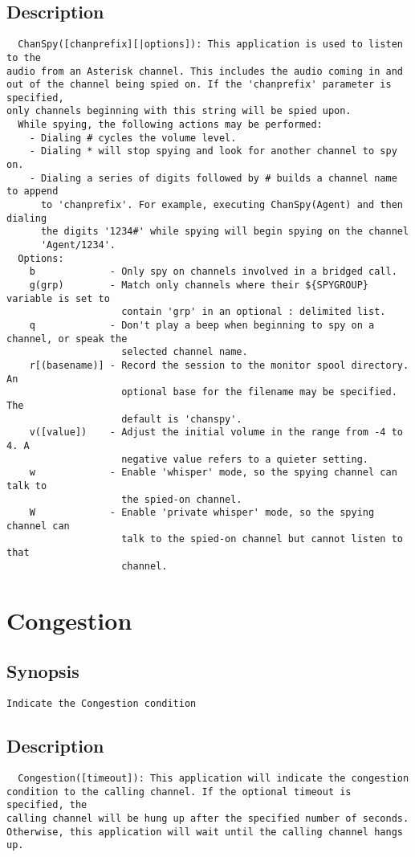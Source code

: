 \subsection{Description}
\begin{verbatim}
  ChanSpy([chanprefix][|options]): This application is used to listen to the
audio from an Asterisk channel. This includes the audio coming in and
out of the channel being spied on. If the 'chanprefix' parameter is specified,
only channels beginning with this string will be spied upon.
  While spying, the following actions may be performed:
    - Dialing # cycles the volume level.
    - Dialing * will stop spying and look for another channel to spy on.
    - Dialing a series of digits followed by # builds a channel name to append
      to 'chanprefix'. For example, executing ChanSpy(Agent) and then dialing
      the digits '1234#' while spying will begin spying on the channel
      'Agent/1234'.
  Options:
    b             - Only spy on channels involved in a bridged call.
    g(grp)        - Match only channels where their ${SPYGROUP} variable is set to
                    contain 'grp' in an optional : delimited list.
    q             - Don't play a beep when beginning to spy on a channel, or speak the
                    selected channel name.
    r[(basename)] - Record the session to the monitor spool directory. An
                    optional base for the filename may be specified. The
                    default is 'chanspy'.
    v([value])    - Adjust the initial volume in the range from -4 to 4. A
                    negative value refers to a quieter setting.
    w             - Enable 'whisper' mode, so the spying channel can talk to
                    the spied-on channel.
    W             - Enable 'private whisper' mode, so the spying channel can
                    talk to the spied-on channel but cannot listen to that
                    channel.

\end{verbatim}


\section{Congestion}
\subsection{Synopsis}
\begin{verbatim}
Indicate the Congestion condition
\end{verbatim}
\subsection{Description}
\begin{verbatim}
  Congestion([timeout]): This application will indicate the congestion
condition to the calling channel. If the optional timeout is specified, the
calling channel will be hung up after the specified number of seconds.
Otherwise, this application will wait until the calling channel hangs up.

\end{verbatim}



